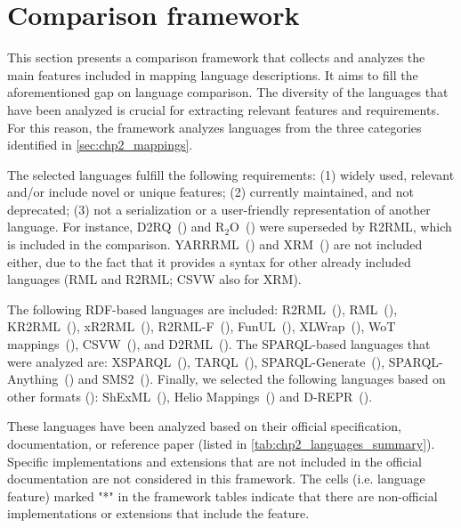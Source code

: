 \section{Comparison framework}
\label{sec:chp4_framework}


This section presents a comparison framework that collects and analyzes the main features included in mapping language descriptions. It aims to fill the aforementioned gap on language comparison. The diversity of the languages that have been analyzed is crucial for extracting relevant features and requirements. For this reason, the framework analyzes languages from the three categories identified in \cref{sec:chp2_mappings}. 

The selected languages fulfill the following requirements: (1) widely used, relevant and/or include novel or unique features; (2) currently maintained, and not deprecated; (3) not a serialization or a user-friendly representation of another language. For instance, D2RQ~(\cite{bizer2004d2rq}) and R$_2$O~(\cite{barrasa2004r2o}) were superseded by R2RML, which is included in the comparison. YARRRML~(\cite{Heyvaert2018yarrrml}) and XRM~(\cite{xrm}) are not included either, due to the fact that it provides a syntax for other already included languages (RML and R2RML; CSVW also for XRM).


The following RDF-based languages are included: R2RML~(\cite{das2012r2rml}), RML~(\cite{Dimou2014rml}), KR2RML~(\cite{slepicka2015kr2rml}), xR2RML~(\cite{michel2015xr2rml}), R2RML-F~(\cite{debruyne2016r2rmlf}), FunUL~(\cite{junior2016funul}),  XLWrap~(\cite{langegger2009xlwrap}), WoT mappings~(\cite{cimmino2020ewot}), CSVW~(\cite{Tennison2015csvw}), and D2\-RML~(\cite{chortaras2018d2rml}). The SPARQL-based languages that were analyzed are: XSPARQL~(\cite{Bischof2012xsparql}), TARQL~(\cite{tarql}),  SPARQL-Gene\-rate~(\cite{Lefrancois2017sparqlgenerate}), SPARQL-Anything~(\cite{daga2021facade}) and SMS2~(\cite{sms2}). Finally, we selected the following languages based on other formats (): ShExML~(\cite{Garcia-Gonzalez2020shexml}), Helio Mappings~(\cite{cimmino2022helio}) and D-REPR~(\cite{Vu2019d-repr}).  

These languages have been analyzed based on their official specification, documentation, or reference paper (listed in \cref{tab:chp2_languages_summary}). Specific implementations and extensions that are not included in the official documentation are not considered in this framework. The cells (i.e. language feature) marked "*"  in the framework tables indicate that there are non-official implementations or extensions that include the feature.

